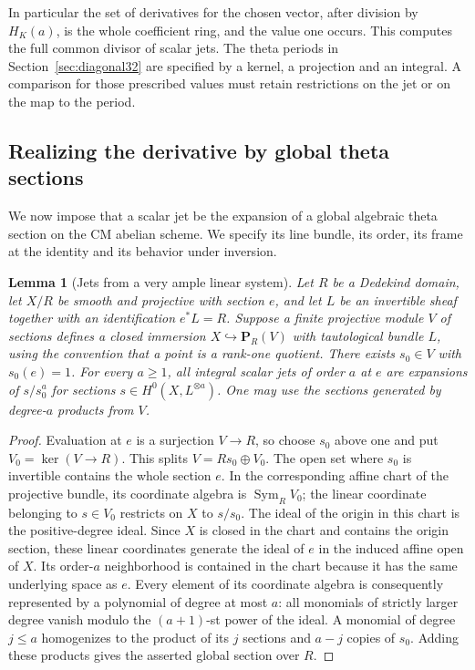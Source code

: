\documentclass[a4paper,11pt]{article}
\newtheorem{lemma}[proposition]{Lemma}
\theoremstyle{definition}
\theoremstyle{remark}
\numberwithin{equation}{section}
\begin{document}
In particular the set of derivatives for the chosen vector, after division by \(H_K(a)\), is the whole coefficient ring, and the value one occurs. This computes the full common divisor of scalar jets. The theta periods in Section~\ref{sec:diagonal32} are specified by a kernel, a projection and an integral. A comparison for those prescribed values must retain restrictions on the jet or on the map to the period.

\subsection{Realizing the derivative by global theta sections}\label{nav:V-05}
\label{sec:theta43}

We now impose that a scalar jet be the expansion of a global algebraic theta section on the CM abelian scheme. We specify its line bundle, its order, its frame at the identity and its behavior under inversion.

\begin{lemma}[Jets from a very ample linear system]\label{lem:very43}
Let \(R\) be a Dedekind domain, let \(X/R\) be smooth and projective with section \(e\), and let \(L\) be an invertible sheaf together with an identification \(e^*L=R\). Suppose a finite projective module \(V\) of sections defines a closed immersion \(X\hookrightarrow\mathbf P_R(V)\) with tautological bundle \(L\), using the convention that a point is a rank-one quotient. There exists \(s_0\in V\) with \(s_0(e)=1\). For every \(a\ge1\), all integral scalar jets of order \(a\) at \(e\) are expansions of \(s/s_0^a\) for sections \(s\in H^0(X,L^{\otimes a})\). One may use the sections generated by degree-\(a\) products from \(V\).
\end{lemma}
\begin{proof}
Evaluation at \(e\) is a surjection \(V\to R\), so choose \(s_0\) above one and put \(V_0=\ker(V\to R)\). This splits \(V=Rs_0\oplus V_0\). The open set where \(s_0\) is invertible contains the whole section \(e\). In the corresponding affine chart of the projective bundle, its coordinate algebra is \(\operatorname{Sym}_R V_0\); the linear coordinate belonging to \(s\in V_0\) restricts on \(X\) to \(s/s_0\). The ideal of the origin in this chart is the positive-degree ideal. Since \(X\) is closed in the chart and contains the origin section, these linear coordinates generate the ideal of \(e\) in the induced affine open of \(X\). Its order-\(a\) neighborhood is contained in the chart because it has the same underlying space as \(e\). Every element of its coordinate algebra is consequently represented by a polynomial of degree at most \(a\): all monomials of strictly larger degree vanish modulo the \((a+1)\)-st power of the ideal. A monomial of degree \(j\le a\) homogenizes to the product of its \(j\) sections and \(a-j\) copies of \(s_0\). Adding these products gives the asserted global section over \(R\).
\end{proof}
\end{document}
